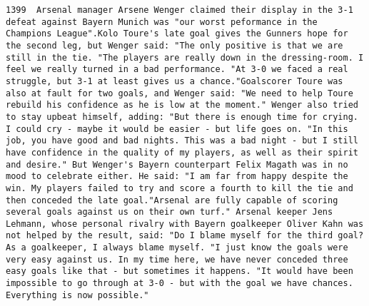 \documentclass[11pt]{article}
\begin{document}
\begin{Verbatim}[commandchars=\\\{\}]
         1399  Arsenal manager Arsene Wenger claimed their display in the 3-1 defeat against Bayern Munich was "our worst peformance in the Champions League".Kolo Toure's late goal gives the Gunners hope for the second leg, but Wenger said: "The only positive is that we are still in the tie. "The players are really down in the dressing-room. I feel we really turned in a bad performance. "At 3-0 we faced a real struggle, but 3-1 at least gives us a chance."Goalscorer Toure was also at fault for two goals, and Wenger said: "We need to help Toure rebuild his confidence as he is low at the moment." Wenger also tried to stay upbeat himself, adding: "But there is enough time for crying. I could cry - maybe it would be easier - but life goes on. "In this job, you have good and bad nights. This was a bad night - but I still have confidence in the quality of my players, as well as their spirit and desire." But Wenger's Bayern counterpart Felix Magath was in no mood to celebrate either. He said: "I am far from happy despite the win. My players failed to try and score a fourth to kill the tie and then conceded the late goal."Arsenal are fully capable of scoring several goals against us on their own turf." Arsenal keeper Jens Lehmann, whose personal rivalry with Bayern goalkeeper Oliver Kahn was not helped by the result, said: "Do I blame myself for the third goal? As a goalkeeper, I always blame myself. "I just know the goals were very easy against us. In my time here, we have never conceded three easy goals like that - but sometimes it happens. "It would have been impossible to go through at 3-0 - but with the goal we have chances. Everything is now possible."                                                                                                                                                                                                                                                                                                                                                                                                                                                                                                                                                                                                                                                                                                                                                                                                                                                                                                                                                                                                                                                                                                                                                                                                                                                                                                                                                                                                                                                                                                                                                                                                                                                                                    
\end{Verbatim}
\end{document}
